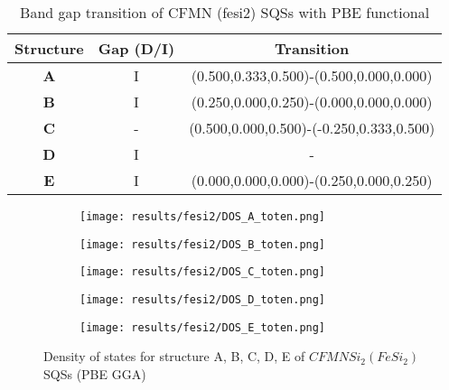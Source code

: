 \begin{table}[H]
\begin{tabular}{@{}ccc@{}}
\toprule
Structure  & Gap (D/I) & Transition                              \\ \midrule
\textbf{A} & I         & (0.500,0.333,0.500)-(0.500,0.000,0.000)  \\
\textbf{B} & I         & (0.250,0.000,0.250)-(0.000,0.000,0.000)  \\
\textbf{C} & -         & (0.500,0.000,0.500)-(-0.250,0.333,0.500) \\
\textbf{D} & I         & -                                        \\
\textbf{E} & I         & (0.000,0.000,0.000)-(0.250,0.000,0.250)  \\ \bottomrule
\end{tabular}
\caption{Band gap transition of CFMN (fesi2) SQSs with PBE functional}
\end{table}


\begin{figure}[H]
\begin{subfigure}{0.5\textwidth}
\texttt{[image: results/fesi2/DOS\_A\_toten.png]}
\end{subfigure}
\begin{subfigure}{0.5\textwidth}
\texttt{[image: results/fesi2/DOS\_B\_toten.png]}
\end{subfigure}
\begin{subfigure}{0.5\textwidth}
\texttt{[image: results/fesi2/DOS\_C\_toten.png]}
\end{subfigure}
\begin{subfigure}{0.5\textwidth}
\texttt{[image: results/fesi2/DOS\_D\_toten.png]}
\end{subfigure}
\begin{subfigure}{0.5\textwidth}
\texttt{[image: results/fesi2/DOS\_E\_toten.png]}
\end{subfigure}
\caption{Density of states for structure A, B, C, D, E of $CFMNSi_2 (FeSi_2)$ SQSs (PBE GGA)}
\label{dos_fesi2_gga}
\end{figure}



